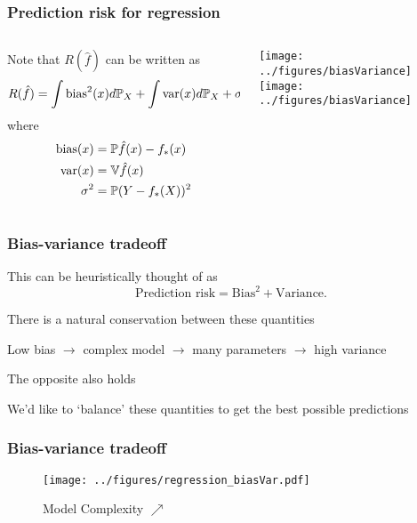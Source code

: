 \documentclass{beamer}
\begin{document}
\begin{frame}
\frametitle{Prediction risk for regression}



\begin{columns}[T]
    \begin{column}{.7\textwidth}
Note that $R(\hat{f})$ can be written as
\[
R(\hat{f}) = \int \textrm{bias}^2(x) d\P_X + \int \textrm{var}(x) d\P_X + \sigma^2
\]
where
\begin{align*}
\textrm{bias}(x) & = \P\hat{f}(x) - f_*(x)\\
\textrm{var}(x) & = \V\hat{f}(x) \\
\sigma^2 & = \P(Y - f_*(X))^2
\end{align*}

\vsp
{}
\end{column}
    \begin{column}{.3\textwidth}
\texttt{[image: ../figures/biasVariance]} \\
\texttt{[image: ../figures/biasVariance]}

\end{column}
\end{columns}
\end{frame}


\begin{frame}
\frametitle{Bias-variance tradeoff}
This can be heuristically thought of as
\[
\textrm{Prediction risk} = \textrm{Bias}^2 + \textrm{Variance}.
\]

There is a natural conservation between these quantities

\vsp
Low bias $\rightarrow$ complex model $\rightarrow$ many parameters $\rightarrow$ high variance

\vsp
The opposite also holds


\vsp
We'd like to `balance' these quantities to get the best possible predictions
\end{frame}

\begin{frame}
\frametitle{Bias-variance tradeoff}
 \begin{figure}
 \centering
 \texttt{[image: ../figures/regression\_biasVar.pdf]}   \\
  \caption*{Model Complexity $\nearrow$}
  \end{figure}
\end{frame}
\end{document}
